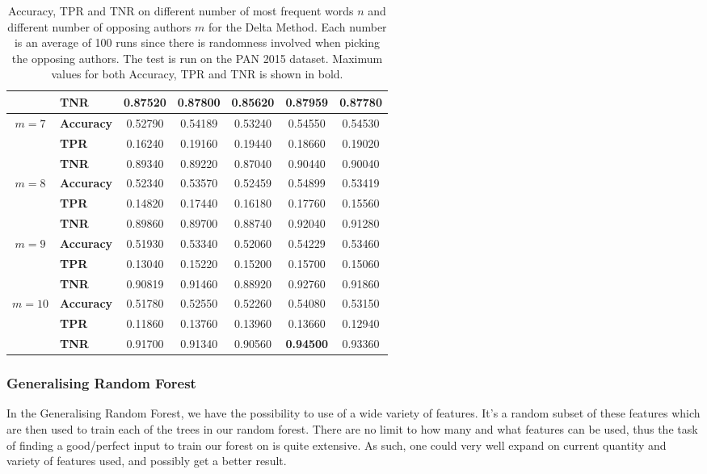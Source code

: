 \begin{table}
\begin{tabular}{c|lccccc}
               & \textbf{TNR}      & 0.87520 & 0.87800 & 0.85620 & 0.87959 & 0.87780 \\
        \hline
        $m=7$  & \textbf{Accuracy} & 0.52790 & 0.54189 & 0.53240 & 0.54550 & 0.54530 \\
               & \textbf{TPR}      & 0.16240 & 0.19160 & 0.19440 & 0.18660 & 0.19020 \\
               & \textbf{TNR}      & 0.89340 & 0.89220 & 0.87040 & 0.90440 & 0.90040 \\
        \hline
        $m=8$  & \textbf{Accuracy} & 0.52340 & 0.53570 & 0.52459 & 0.54899 & 0.53419 \\
               & \textbf{TPR}      & 0.14820 & 0.17440 & 0.16180 & 0.17760 & 0.15560 \\
               & \textbf{TNR}      & 0.89860 & 0.89700 & 0.88740 & 0.92040 & 0.91280 \\
        \hline
        $m=9$  & \textbf{Accuracy} & 0.51930 & 0.53340 & 0.52060 & 0.54229 & 0.53460 \\
               & \textbf{TPR}      & 0.13040 & 0.15220 & 0.15200 & 0.15700 & 0.15060 \\
               & \textbf{TNR}      & 0.90819 & 0.91460 & 0.88920 & 0.92760 & 0.91860 \\
        \hline
        $m=10$ & \textbf{Accuracy} & 0.51780 & 0.52550 & 0.52260 & 0.54080 & 0.53150 \\
               & \textbf{TPR}      & 0.11860 & 0.13760 & 0.13960 & 0.13660 & 0.12940 \\
               & \textbf{TNR}      & 0.91700 & 0.91340 & 0.90560 & \textbf{0.94500} & 0.93360
    \end{tabular}
    \caption{Accuracy, \gls{TPR} and \gls{TNR} on different number of most
        frequent words $n$ and different number of opposing authors $m$ for the
        Delta Method. Each number is an average of 100 runs since there is
        randomness involved when picking the opposing authors. The test is run
        on the PAN 2015 dataset. Maximum values for both Accuracy, \gls{TPR} and
        \gls{TNR} is shown in bold.}
    \label{fig:delta_pan_2015_res}
\end{table}

\subsubsection{Generalising Random Forest} \label{subsubsec:method:generalising_random_forest}
In the Generalising Random Forest, we have the possibility to use of a wide
variety of features. It's a random subset of these features which are then used
to train each of the trees in our random forest. There are no limit to how many
and what features can be used, thus the task of finding a good/perfect input to
train our forest on is quite extensive. As such, one could very well expand on
current quantity and variety of features used, and possibly get a better result.

